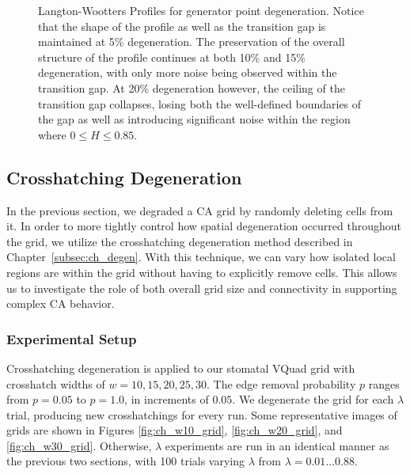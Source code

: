 \documentclass[a4paper,11pt]{report}
\begin{document}
\begin{figure}[htp]
\caption[Langton-Wootters Profile for Generator Point Degeneration]{
  Langton-Wootters Profiles for generator point degeneration. Notice that the shape of the profile as well as the transition gap is maintained at 5\% degeneration. The preservation of the overall structure of the profile continues at both 10\% and 15\% degeneration, with only more noise being observed within the transition gap. At 20\% degeneration however, the ceiling of the transition gap collapses, losing both the well-defined boundaries of the gap as well as introducing significant noise within the region where $0 \le H \le 0.85$.
}
\label{fig:lw_gen_pt_degen}
\end{figure}

\subsection{Crosshatching Degeneration}

In the previous section, we degraded a CA grid by randomly deleting cells from it. In order to more tightly control how spatial degeneration occurred throughout the grid, we utilize the crosshatching degeneration method described in Chapter~\ref{subsec:ch_degen}. With this technique, we can vary how isolated local regions are within the grid without having to explicitly remove cells. This allows us to investigate the role of both overall grid size and connectivity in supporting complex CA behavior.

\subsubsection*{Experimental Setup}
Crosshatching degeneration is applied to our stomatal VQuad grid with crosshatch widths of $w=10,15,20,25,30$. The edge removal probability $p$ ranges from $p=0.05$ to $p=1.0$, in increments of $0.05$. We degenerate the grid for each $\lambda$ trial, producing new crosshatchings for every run. Some representative images of grids are shown in Figures \ref{fig:ch_w10_grid}, \ref{fig:ch_w20_grid}, and \ref{fig:ch_w30_grid}. Otherwise, $\lambda$ experiments are run in an identical manner as the previous two sections, with 100 trials varying $\lambda$ from $\lambda=0.01...0.88$.
\end{document}
